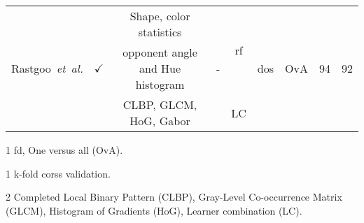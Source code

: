 \begin{table}
{{\begin{threeparttable}
\begin{tabular}{l c c cc	c   c cc}
\multirow{3}{*}{Rastgoo~\emph{et~al.}\cite{rastgoo2015ensemble}} & \multirow{3}{*}{$\checkmark$} & Shape, color statistics & \multirow{3}{*}{-} & \multirow{2}{*}{\acs{rf}}  & \multirow{3}{*}{\acs{dos}}& \multirow{3}{*}{OvA} & \multirow{3}{*}{94} & \multirow{3}{*}{92}\\
&  & opponent angle and Hue histogram & &   &  &  & & \\
&  & CLBP, GLCM, HoG, Gabor\tnote{3} & & LC\tnote{3} & & & & \\
\bottomrule
\end{tabular}
 \begin{tablenotes}
  \item[1] \acf{fd}, One versus all (OvA).
  \item[1] k-fold corss validation.
  \item[2] Completed Local Binary Pattern (CLBP), Gray-Level Co-occurrence Matrix (GLCM), Histogram of Gradients (HoG), Learner combination (LC).
  
  \end{tablenotes}

\end{threeparttable}
}}
\label{tab:rw}
\end{table}


%
%
%
%
%
%

